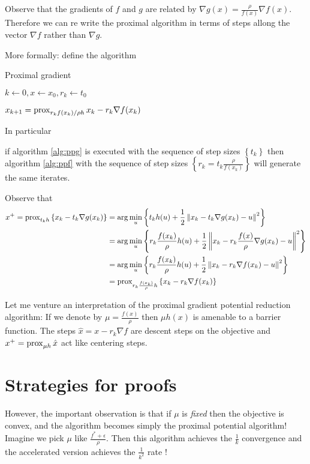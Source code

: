 \documentclass[smallextended]{svjour3}       %
\begin{document}
Observe that the gradients of $f$ and $g$ are related by $\nabla g(x) = \frac{\rho}{f(x)}\nabla f(x)$.
Therefore we can re write the proximal algorithm in terms of steps allong the vector
$\nabla f$ rather than $\nabla g$. 

More formally: define the algorithm
\begin{algorithm}{Proximal gradient}
  \caption{Proximal Gradient}
  \begin{algorithmic}
  \STATE $k \gets 0, x \gets x_0, r_k \gets t_0$

    \STATE $x_{k+1} = \operatorname{prox}_{r_kf(x_k)/\rho h}{x_k - r_k \nabla f(x_k)}$
  \ENDWHILE
  \end{algorithmic}
  \label{alg:ppf}
\end{algorithm}

In particular 
\begin{clm}
if algorithm \eqref{alg:ppg} is executed with the sequence of 
step sizes $\left\{ t_k \right\}$ then algorithm \eqref{alg:ppf} with 
the sequence of step sizes $\left\{ r_k = t_k \frac{\rho}{f(x_k)}\right\}$ will generate the same iterates.

\end{clm}
\begin{prf}
 Observe that 
 \begin{align*}
   x^+ = \operatorname{prox}_{t_kh}\left\{x_k - t_k \nabla g(x_k)\right\} & = \arg \min_u \left\{ t_kh(u) + \frac{1}{2}\left\| x_k - t_k \nabla g(x_k)-u \right\|^2 \right\} \\
   & = \arg \min_u \left\{ r_k\frac{f(x_k)}{\rho}h(u) + \frac{1}{2}\left\| x_k - r_k\frac{f(x)}{\rho} \nabla g(x_k)-u \right\|^2 \right\} \\
   & = \arg \min_u \left\{ r_k\frac{f(x_k)}{\rho}h(u) + \frac{1}{2}\left\| x_k - r_k\nabla f(x_k)-u \right\|^2 \right\} \\
   & = \operatorname{prox}_{r_k\frac{f(x_k)}{\rho}h}\left\{x_k - r_k\nabla f(x_k)\right\}
 \end{align*} 
 \end{prf} 

 Let me venture an interpretation of the proximal gradient potential reduction algorithm:
 If we denote by $\mu = \frac{f(x)}{\rho}$ then $\mu h(x)$ is amenable to a barrier function. 
 The steps $\hat x = x - r_k\nabla f$ are descent steps on the objective and $x^+ = \operatorname{prox}_{\mu h}{\hat x}$ act
 like centering steps.


 \section{Strategies for proofs}
 However, the important observation is that if $\mu$ is {\em fixed} then the
 objective is convex, and the algorithm becomes simply the proximal potential
 algorithm! Imagine we pick $\mu$ like $\frac{f^*+\epsilon}{\rho}$.  Then this
 algorithm achieves the $\frac{1}{k}$ convergence and the accelerated version
 achieves the $\frac{1}{k^2}$ rate !
\end{document}
